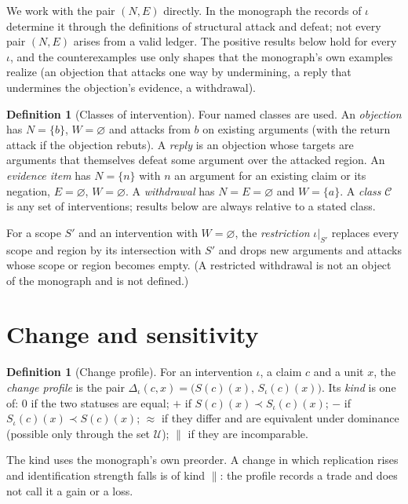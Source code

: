 \documentclass[11pt]{article}
\theoremstyle{plain}
\theoremstyle{definition}
\newtheorem{definition}[theorem]{Definition}
\theoremstyle{remark}
\begin{document}
We work with the pair $(N,E)$ directly. In the monograph the records of $\iota$ determine it through the definitions of structural attack and defeat; not every pair $(N,E)$ arises from a valid ledger. The positive results below hold for every $\iota$, and the counterexamples use only shapes that the monograph's own examples realize (an objection that attacks one way by undermining, a reply that undermines the objection's evidence, a withdrawal).

\begin{definition}[Classes of intervention]\label{def:classes}
Four named classes are used. An \emph{objection} has $N=\{b\}$, $W=\varnothing$ and attacks from $b$ on existing arguments (with the return attack if the objection rebuts). A \emph{reply} is an objection whose targets are arguments that themselves defeat some argument over the attacked region. An \emph{evidence item} has $N=\{n\}$ with $n$ an argument for an existing claim or its negation, $E=\varnothing$, $W=\varnothing$. A \emph{withdrawal} has $N=E=\varnothing$ and $W=\{a\}$. A \emph{class} $\mathcal C$ is any set of interventions; results below are always relative to a stated class.
\end{definition}

For a scope $S'$ and an intervention with $W=\varnothing$, the \emph{restriction} $\iota|_{S'}$ replaces every scope and region by its intersection with $S'$ and drops new arguments and attacks whose scope or region becomes empty. (A restricted withdrawal is not an object of the monograph and is not defined.)

\section{Change and sensitivity}\label{sec:change}

\begin{definition}[Change profile]\label{def:change}
For an intervention $\iota$, a claim $c$ and a unit $x$, the \emph{change profile} is the pair $\Delta_\iota(c,x)=\bigl(S(c)(x),\,S_\iota(c)(x)\bigr)$. Its \emph{kind} is one of: $0$ if the two statuses are equal; $+$ if $S(c)(x)\prec S_\iota(c)(x)$; $-$ if $S_\iota(c)(x)\prec S(c)(x)$; $\approx$ if they differ and are equivalent under dominance (possible only through the set $\mathcal U$); $\parallel$ if they are incomparable.
\end{definition}

The kind uses the monograph's own preorder. A change in which replication rises and identification strength falls is of kind $\parallel$: the profile records a trade and does not call it a gain or a loss.
\end{document}
